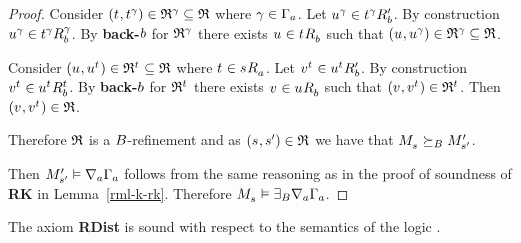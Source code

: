 \begin{proof}
Consider $(\kStateT, \kStateT[\gamma]) \in \refinement^\gamma \subseteq \refinement$ where $\gamma \in \Gamma_\agentA$.
Let $\kStateU[\gamma] \in \kSuccessorsPB{\kStateT[\gamma]}$.
By construction $\kStateU[\gamma] \in \kSuccessorsB[\gamma]{\kStateT[\gamma]}$.
By {\bf back-$\agentB$} for $\refinement^\gamma$ there exists $\kStateU \in \kSuccessorsB{\kStateT}$ such that $(\kStateU, \kStateU[\gamma]) \in \refinement^\gamma \subseteq \refinement$.

Consider $(\kStateU, \kStateU[\kStateT]) \in \refinement^{\kStateT} \subseteq \refinement$ where $\kStateT \in \kSuccessorsA{\kStateS}$.
Let $\kStateV[\kStateT] \in \kSuccessorsPB{\kStateU[\kStateT]}$.
By construction $\kStateV[\kStateT] \in \kSuccessorsB[\kStateT]{\kStateU[\kStateT]}$.
By {\bf back-$\agentB$} for $\refinement^{\kStateT}$ there exists $\kStateV \in \kSuccessorsB{\kStateU}$ such that $(\kStateV, \kStateV[\kStateT]) \in \refinement^{\kStateT}$.
Then $(\kStateV, \kStateV[\kStateT]) \in \refinement$.

Therefore $\refinement$ is a $\agentsB$-refinement and as $(\kStateS, \kStateSP) \in \refinement$ we have that $\kPModel{\kStateS} \simulatesBs \kPModelP{\kStateSP}$.

Then $\kPModelP{\kStateSP} \entails \coversA \Gamma_\agentA$ follows from the same reasoning as in the proof of soundness of {\bf RK} in Lemma~\ref{rml-k-rk}.
Therefore $\kPModel{\kStateS} \entails \somerefsBs \coversA \Gamma_\agentA$.

\end{proof}

\begin{lemma}
The axiom {\bf RDist} is sound with respect to the semantics of the logic \logicRmlK{}.
\end{lemma}

